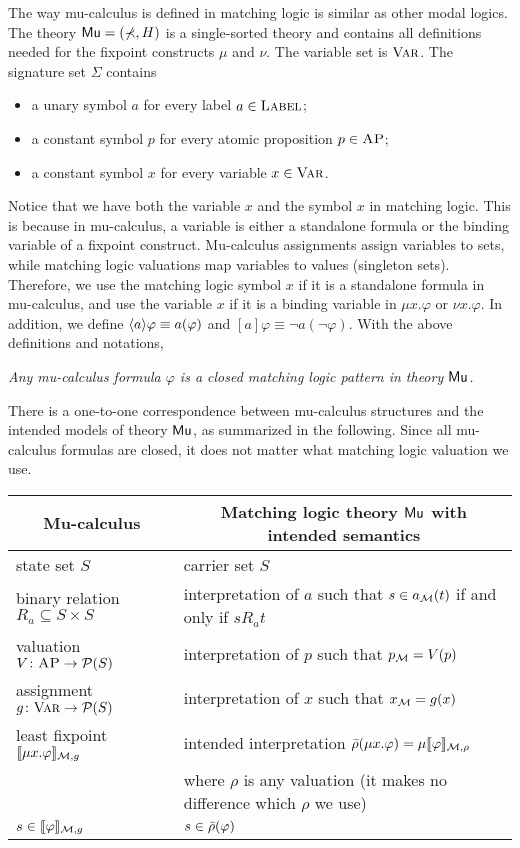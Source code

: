 \documentclass{amsart}
\begin{document}
The way mu-calculus is defined in matching logic is similar
as other modal logics.
The theory $\mathsf{Mu} = (\mathbb{\Sigma}, H)$ is a single-sorted theory and
contains all definitions needed for 
the fixpoint constructs $\mu$ and $\nu$.
The variable set is ${\normalfont\textsc{Var}}$.
The signature set $\Sigma$ contains
\begin{itemize}
	\item a unary symbol $a$ for every label $a \in \textsc{Label}$; 
	\item a constant symbol $p$ for every atomic proposition $p \in \textsc{AP}$;
	\item a constant symbol $x$ for every variable $x \in {\normalfont\textsc{Var}}$.
\end{itemize}
Notice that we have both the variable $x$ and the symbol $x$ in matching logic.
This is because in mu-calculus, a variable is either a standalone formula or
the binding variable of a fixpoint construct.
Mu-calculus assignments assign variables to sets, while matching logic
valuations
map variables to values (singleton sets).
Therefore, we use the matching logic symbol $x$ if it is a standalone formula in
mu-calculus,
and use the variable $x$ if it is a binding variable in $\mu x . \varphi$ or
$\nu x . \varphi$.
In addition, we define $\langle a\rangle\varphi \equiv a(\varphi)$
and $[a]\varphi \equiv \neg a(\neg \varphi)$.
With the above definitions and notations,
\begin{center}
	\em
	Any mu-calculus formula $\varphi$ is a closed matching logic pattern
	in theory $\mathsf{Mu}$.
\end{center}

There is a one-to-one correspondence between
mu-calculus structures and the intended models of theory $\mathsf{Mu}$,
as summarized in the following.
Since all mu-calculus formulas are closed,
it does not matter what matching logic valuation we use.
\begin{center}
	\begin{tabular}{ll}
		\multicolumn{1}{c}{Mu-calculus} & 
		\multicolumn{1}{c}{Matching logic theory $\mathsf{Mu}$ with intended semantics}
		\\\hline
		state set $S$ & carrier set $S$
		\\
		binary relation $R_a \subseteq S \times S$ & interpretation of $a$ such that
		$s \in a_{\mathcal{M}} (t)$ if and only if $s R_a t$
		\\
		valuation $V \colon \textsc{AP} \to \mathcal{P}(S)$
		& interpretation of $p$ such that $p_{\mathcal{M}} = V(p)$
		\\
		assignment $g \colon {\normalfont\textsc{Var}} \to \mathcal{P}(S)$
		& interpretation of $x$ such that $x_{\mathcal{M}} = g(x)$
		\\
		least fixpoint $\llbracket\mu x . \varphi\rrbracket_{\mathcal{M},g}$
		&
		intended interpretation $\bar{\rho}(\mu x . \varphi) = \mu
		\llbracket\varphi\rrbracket_{\mathcal{M},\rho}$
		\\&
		where $\rho$ is any valuation (it makes no difference which $\rho$ we use)
		\\
		$s \in \llbracket\varphi\rrbracket_{\mathcal{M},g}$
		& $s \in \bar{\rho}(\varphi)$
	\end{tabular}
\end{center}
\end{document}
